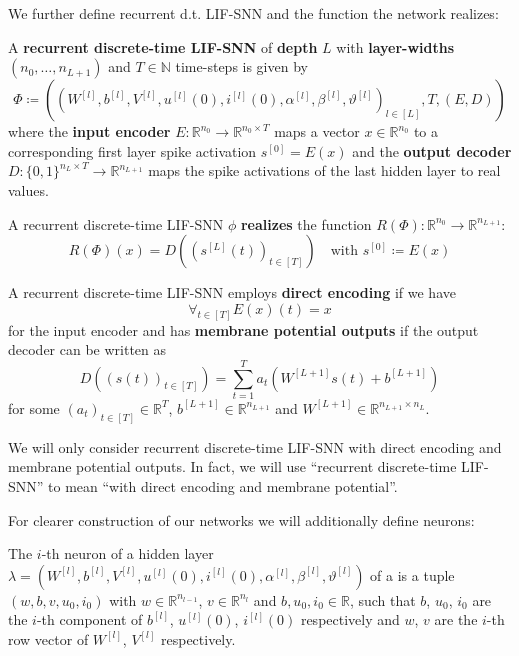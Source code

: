 We further define recurrent d.t. LIF-SNN and the function the network realizes:
\begin{definition}
  A \textbf{recurrent discrete-time LIF-SNN} of \textbf{depth} \(L\) with \textbf{layer-widths} \((n_0,…,n_{L+1})\) and \(T∈ℕ\) time-steps is given by
  \[ Φ≔((W^{[l]},b^{[l]},V^{[l]},u^{[l]}(0),i^{[l]}(0),α^{[l]},β^{[l]},ϑ^{[l]})_{l∈[L]},T,(E,D)) \]
  where the \textbf{input encoder} \(E:ℝ^{n_0}→ℝ^{n_0×T}\) maps a vector \(x∈ℝ^{n_0}\) to a corresponding first layer spike activation \(s^{[0]}=E(x)\) and the \textbf{output decoder} \(D:\{0,1\}^{n_L×T}→ℝ^{n_{L+1}}\) maps the spike activations of the last hidden layer to real values.
\end{definition}


\begin{definition}
  A recurrent discrete-time LIF-SNN \(ϕ\) \textbf{realizes} the function \(R(Φ):ℝ^{n_0}→ℝ^{n_{L+1}}\):
  \[ R(Φ)(x)=D((s^{[L]}(t))_{t∈[T]})\quad \text{with }s^{[0]}≔E(x)\]
\end{definition}

\begin{definition}
  A recurrent discrete-time LIF-SNN employs \textbf{direct encoding} if we have
  \[ ∀_{t∈[T]}E(x)(t)=x \]
  for the input encoder and has \textbf{membrane potential outputs} if the output decoder can be written as
  \[ D((s(t))_{t∈[T]})=\sum_{t=1}^Ta_t(W^{[L+1]}s(t)+b^{[L+1]}) \]
  for some \((a_t)_{t∈[T]}∈ℝ^T\), \(b^{[L+1]}∈ℝ^{n_{L+1}}\) and \(W^{[L+1]}∈ℝ^{n_{L+1}×n_L}\).
\end{definition}
We will only consider recurrent discrete-time LIF-SNN with direct encoding and membrane potential outputs. In fact, we will use “recurrent discrete-time LIF-SNN” to mean “\rdtlifsnn with direct encoding and membrane potential”.

For clearer construction of our networks we will additionally define neurons:

\begin{definition}
  The \(i\)-th neuron of a hidden layer \(λ=(W^{[l]},b^{[l]},V^{[l]},u^{[l]}(0),i^{[l]}(0),α^{[l]},β^{[l]},ϑ^{[l]})\) of a \rdtlifsnn is a tuple \((w,b,v,u_0,i_0)\) with \(w∈ℝ^{n_{l-1}}\), \(v∈ℝ^{n_l}\) and \(b,u_0,i_0∈ℝ\), such that \(b\), \(u_0\), \(i_0\) are the \(i\)-th component of \(b^{[l]}\), \(u^{[l]}(0)\), \(i^{[l]}(0)\) respectively and \(w\), \(v\) are the \(i\)-th row vector of \(W^{[l]}\), \(V^{[l]}\) respectively.
\end{definition}

